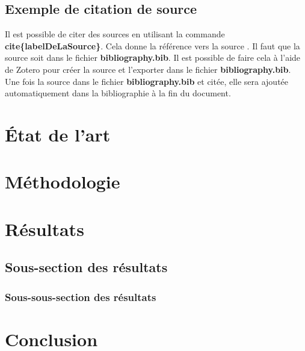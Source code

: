 \documentclass[12pt]{article}
\begin{document}
\subsection{Exemple de citation de source}

Il est possible de citer des sources en utilisant la commande \textbf{\\cite\{labelDeLaSource\}}.
\newline
Cela donne la référence vers la source \cite{sumpterFittingXGModel}.
\newline
Il faut que la source soit dans le fichier \textbf{bibliography.bib}. Il est possible de faire cela à l'aide de Zotero pour créer la source et l'exporter dans le fichier \textbf{bibliography.bib}.
\newline
Une fois la source dans le fichier \textbf{bibliography.bib} et citée, elle sera ajoutée automatiquement dans la bibliographie à la fin du document.

\section{État de l'art}
\section{Méthodologie}
\section{Résultats}
\subsection{Sous-section des résultats}
\subsubsection{Sous-sous-section des résultats}

\section{Conclusion}




\end{document}

